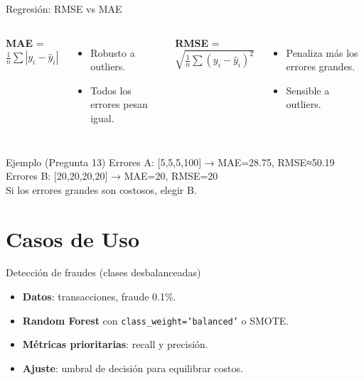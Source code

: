 \documentclass[aspectratio=169, 10pt, xcolor=table]{beamer}
\begin{document}
\begin{frame}{Regresión: RMSE vs MAE}
    \begin{columns}[t]
        \textbf{MAE} = $\frac{1}{n}\sum |y_i - \hat{y}_i|$
        \begin{itemize}
            \item Robusto a outliers.
            \item Todos los errores pesan igual.
        \end{itemize}
        \textbf{RMSE} = $\sqrt{\frac{1}{n}\sum (y_i - \hat{y}_i)^2}$
        \begin{itemize}
            \item Penaliza más los errores grandes.
            \item Sensible a outliers.
        \end{itemize}
    \end{columns}
    \vspace{0.3cm}
    \begin{exampleblock}{Ejemplo (Pregunta 13)}
        Errores A: [5,5,5,100] → MAE=28.75, RMSE≈50.19 \\
        Errores B: [20,20,20,20] → MAE=20, RMSE=20 \\
        Si los errores grandes son costosos, elegir B.
    \end{exampleblock}
\end{frame}

\section{Casos de Uso}

\begin{frame}{Detección de fraudes (clases desbalanceadas)}
    \begin{itemize}
        \item \textbf{Datos}: transacciones, fraude 0.1\%.
        \item \textbf{Random Forest} con \texttt{class\_weight='balanced'} o SMOTE.
        \item \textbf{Métricas prioritarias}: recall y precisión.
        \item \textbf{Ajuste}: umbral de decisión para equilibrar costos.
    \end{itemize}
\end{frame}
\end{document}
